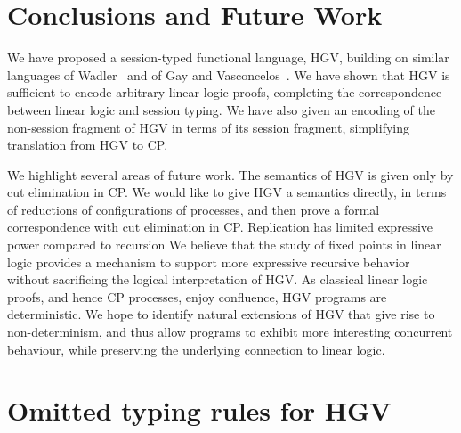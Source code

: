 \documentclass{easychair}
\newcommand{\hgv}{HGV\xspace}
\begin{document}
\section{Conclusions and Future Work}

We have proposed a session-typed functional language, \hgv, building on similar languages of
Wadler~\cite{Wadler12} and of Gay and Vasconcelos~\cite{GayVasconcelos10}. We have shown that \hgv
is sufficient to encode arbitrary linear logic proofs, completing the correspondence between linear
logic and session typing. We have also given an encoding of the non-session fragment of \hgv in
terms of its session fragment, simplifying translation from \hgv to CP.

We highlight several areas of future work.
The semantics of \hgv is given only by cut elimination in CP. We would like to give \hgv a semantics
directly, in terms of reductions of configurations of processes, and then prove a formal
correspondence with cut elimination in CP.
Replication has limited expressive power compared to recursion
  We believe that the study of fixed points in linear logic provides a mechanism to support more
  expressive recursive behavior without sacrificing the logical interpretation of \hgv.
 As classical linear logic proofs, and hence CP processes, enjoy confluence, \hgv programs are
  deterministic. We hope to identify natural extensions of \hgv that give rise to non-determinism,
  and thus allow programs to exhibit more interesting concurrent behaviour, while preserving the
  underlying connection to linear logic.

\label{sect:bib}

%
%
%




\appendix

\section{Omitted typing rules for HGV}\label{sect:hgv-omitted}
\end{document}
